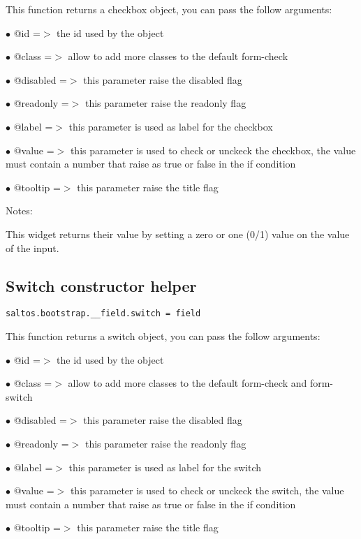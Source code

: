 \documentclass[a4paper]{book}
\begin{document}
This function returns a checkbox object, you can pass the follow arguments:

\begin{compactitem}
\item[\color{myblue}$\bullet$] @id       =$>$ the id used by the object
\item[\color{myblue}$\bullet$] @class    =$>$ allow to add more classes to the default form-check
\item[\color{myblue}$\bullet$] @disabled =$>$ this parameter raise the disabled flag
\item[\color{myblue}$\bullet$] @readonly =$>$ this parameter raise the readonly flag
\item[\color{myblue}$\bullet$] @label    =$>$ this parameter is used as label for the checkbox
\item[\color{myblue}$\bullet$] @value    =$>$ this parameter is used to check or unckeck the checkbox, the value
             must contain a number that raise as true or false in the if condition
\item[\color{myblue}$\bullet$] @tooltip  =$>$ this parameter raise the title flag
\end{compactitem}

Notes:

This widget returns their value by setting a zero or one (0/1) value on the value of the input.

\hypertarget{toc450}{}
\subsection{Switch constructor helper}

\begin{lstlisting}
saltos.bootstrap.__field.switch = field
\end{lstlisting}

This function returns a switch object, you can pass the follow arguments:

\begin{compactitem}
\item[\color{myblue}$\bullet$] @id       =$>$ the id used by the object
\item[\color{myblue}$\bullet$] @class    =$>$ allow to add more classes to the default form-check and form-switch
\item[\color{myblue}$\bullet$] @disabled =$>$ this parameter raise the disabled flag
\item[\color{myblue}$\bullet$] @readonly =$>$ this parameter raise the readonly flag
\item[\color{myblue}$\bullet$] @label    =$>$ this parameter is used as label for the switch
\item[\color{myblue}$\bullet$] @value    =$>$ this parameter is used to check or unckeck the switch, the value
             must contain a number that raise as true or false in the if condition
\item[\color{myblue}$\bullet$] @tooltip  =$>$ this parameter raise the title flag
\end{compactitem}
\end{document}
